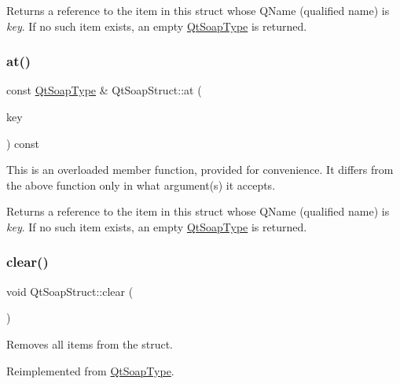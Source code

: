 Returns a reference to the item in this struct whose Q\+Name (qualified name) is {\itshape key}. If no such item exists, an empty \mbox{\hyperlink{class_qt_soap_type}{Qt\+Soap\+Type}} is returned. \mbox{\label{class_qt_soap_struct_a03c8b506cd61d2a7fe837058a3a8ce1b}} 
\subsubsection{\texorpdfstring{at()}{at()}\hspace{0.1cm}{\footnotesize\ttfamily [2/2]}}
{\footnotesize\ttfamily const \mbox{\hyperlink{class_qt_soap_type}{Qt\+Soap\+Type}} \& Qt\+Soap\+Struct\+::at (\begin{DoxyParamCaption}\item[{const \mbox{\hyperlink{class_qt_soap_q_name}{Qt\+Soap\+Q\+Name}} \&}]{key }\end{DoxyParamCaption}) const}

This is an overloaded member function, provided for convenience. It differs from the above function only in what argument(s) it accepts.

Returns a reference to the item in this struct whose Q\+Name (qualified name) is {\itshape key}. If no such item exists, an empty \mbox{\hyperlink{class_qt_soap_type}{Qt\+Soap\+Type}} is returned. \mbox{\label{class_qt_soap_struct_a22f59c734dc676b9906e0d657052897f}} 
\subsubsection{\texorpdfstring{clear()}{clear()}}
{\footnotesize\ttfamily void Qt\+Soap\+Struct\+::clear (\begin{DoxyParamCaption}{ }\end{DoxyParamCaption})\hspace{0.3cm}{\ttfamily [virtual]}}

Removes all items from the struct. 

Reimplemented from \mbox{\hyperlink{class_qt_soap_type_a9fac9664d334143114c31610ef02c53d}{Qt\+Soap\+Type}}.

\mbox{\label{class_qt_soap_struct_a3ae0552d2991d545b285e66bbaad560f}} 
